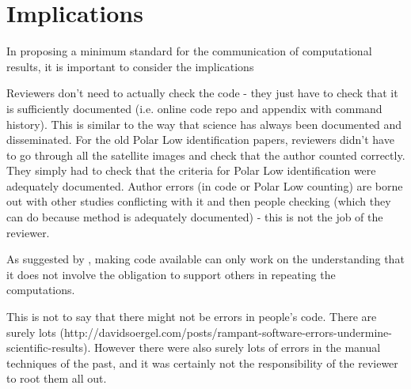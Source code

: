 \section{Implications}

In proposing a minimum standard for the communication of computational results, it is important to consider the implications 

Reviewers don't need to actually check the code - they just have to check that it is sufficiently documented (i.e. online code repo and appendix with command history). This is similar to the way that science has always been documented and disseminated. For the old Polar Low identification papers, reviewers didn't have to go through all the satellite images and check that the author counted correctly. They simply had to check that the criteria for Polar Low identification were adequately documented. Author errors (in code or Polar Low counting) are borne out with other studies conflicting with it and then people checking (which they can do because method is adequately documented) - this is not the job of the reviewer.

As suggested by \citet{Easterbrook2014}, making code available can only work on the understanding that it does not involve the obligation to support others in repeating the computations.

This is not to say that there might not be errors in people's code. There are surely lots (http://davidsoergel.com/posts/rampant-software-errors-undermine-scientific-results). However there were also surely lots of errors in the manual techniques of the past, and it was certainly not the responsibility of the reviewer to root them all out.
